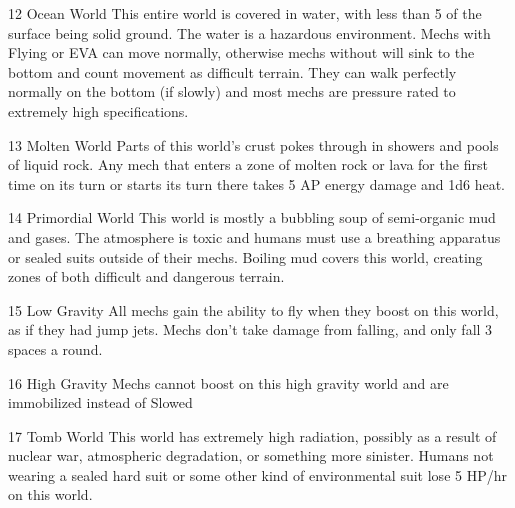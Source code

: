12      Ocean World                        This entire world is covered in water, with less than 5%
                                            of the surface being solid ground. The water is a  
                                            hazardous environment. Mechs with Flying or EVA can  
                                            move normally, otherwise mechs without will sink to the  
                                            bottom and count movement as difficult terrain. They  
                                            can walk perfectly normally on the bottom (if slowly)  
                                            and most mechs are pressure rated to extremely high  
                                            specifications. 

13      Molten World                        Parts of this world’s crust pokes through in showers  
                                            and pools of liquid rock. Any mech that enters a zone of  
                                            molten rock or lava for the first time on its turn or starts  
                                            its turn there takes 5 AP energy damage and 1d6 heat. 

14      Primordial World                   This world is mostly a bubbling soup of semi-organic  
                                            mud and gases. The atmosphere is toxic and humans  
                                            must use a breathing apparatus or sealed suits outside  
                                            of their mechs. Boiling mud covers this world, creating  
                                            zones of both difficult and dangerous terrain. 

15      Low Gravity                        All mechs gain the ability to fly when they boost on this  
                                            world, as if they had jump jets. Mechs don’t take  
                                            damage from falling, and only fall 3 spaces a round. 

                                                                                                        


 16      High Gravity                        Mechs cannot boost on this high gravity world and are  
                                             immobilized instead of Slowed 

 17      Tomb World                          This world has extremely high radiation, possibly as a  
                                             result of nuclear war, atmospheric degradation, or  
                                             something more sinister. Humans not wearing a sealed  
                                             hard suit or some other kind of environmental suit lose  
                                             5 HP/hr on this world. 

